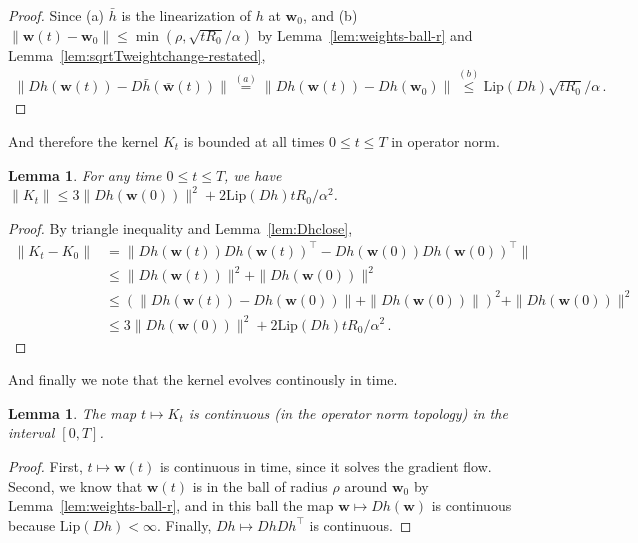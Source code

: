 \documentclass[11pt]{article} %
\newcommand{\<}{\langle}
\renewcommand{\>}{\rangle}
\def\bw{{\boldsymbol w}}
\def\barbw{\bar{\bw}}
\newcommand{\Lip}{\mathrm{Lip}}
\theoremstyle{plain}
\newtheorem{lemma}[theorem]{Lemma}
\theoremstyle{definition}
\theoremstyle{remark}
\begin{document}
\begin{proof}
Since (a) $\bar{h}$ is the linearization of $h$ at $\bw_0$, and (b) $\|\bw(t) - \bw_0\| \leq \min(\rho,\sqrt{t R_0} / \alpha)$ by  Lemma~\ref{lem:weights-ball-r} and Lemma~\ref{lem:sqrtTweightchange-restated},
\begin{align*}
\|Dh(\bw(t)) - D\bar{h}(\barbw(t))\| \stackrel{(a)}{=} \|Dh(\bw(t)) - Dh(\bw_0)\| \stackrel{(b)}{\leq} \Lip(Dh) \sqrt{t R_0} / \alpha\,.
\end{align*}
\end{proof}
And therefore the kernel $K_t$ is bounded at all times $0 \leq t \leq T$ in operator norm.
\begin{lemma}\label{lem:Ktbounded}
For any time $0 \leq t \leq T$, we have $\|K_t\| \leq 3\|Dh(\bw(0))\|^2 + 2\Lip(Dh)tR_0 / \alpha^2$.
\end{lemma}
\begin{proof}
By triangle inequality and Lemma~\ref{lem:Dhclose},
\begin{align*}
\|K_t - K_0\| &= \|Dh(\bw(t))Dh(\bw(t))^{\top} - Dh(\bw(0))Dh(\bw(0))^{\top}\| \\
&\leq \|Dh(\bw(t))\|^2 +\|Dh(\bw(0))\|^2 \\
&\leq (\|Dh(\bw(t)) - Dh(\bw(0))\| + \|Dh(\bw(0))\|)^2 + \|Dh(\bw(0))\|^2 \\
&\leq 3\|Dh(\bw(0))\|^2 + 2\Lip(Dh)tR_0 / \alpha^2\,.
\end{align*}
\end{proof}

And finally we note that the kernel evolves continously in time.
\begin{lemma}\label{lem:Ktcontinuous}
The map $t \mapsto K_t$ is continuous (in the operator norm topology) in the interval $[0,T]$.
\end{lemma}
\begin{proof}
First, $t \mapsto \bw(t)$ is continuous in time, since it solves the gradient flow. Second, we know that $\bw(t)$ is in the ball of radius $\rho$ around $\bw_0$ by Lemma~\ref{lem:weights-ball-r}, and in this ball the map $\bw \mapsto Dh(\bw)$ is continuous because $\Lip(Dh) < \infty$. Finally, $Dh \mapsto Dh Dh^{\top}$ is continuous.
\end{proof}
\end{document}
